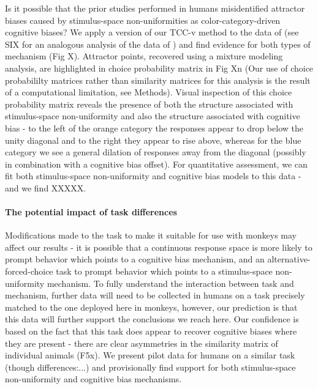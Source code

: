 \documentclass[9pt,biorxiv,lineno,onehalfspacing]{lapreprint}
\begin{document}
\begin{refsection}
Is it possible that the prior studies performed in humans misidentified attractor biases caused by stimulus-space non-uniformities as color-category-driven cognitive biases?
We apply a version of our TCC-v method to the data of \citet{bae_why_2015} (see SIX for an analogous analysis of the data of \citet{panichello_error-correcting_2019}%
) and find evidence for both types of mechanism (Fig X).
Attractor points, recovered using a mixture modeling analysis, are highlighted in choice probability matrix in Fig Xn (Our use of choice probabililty matrices rather than similarity matrices for this analysis is the result of a computational limitation, see Methods).
Visual inspection of this choice probability matrix reveals the presence of both the structure associated with stimulus-space non-uniformity and also the structure associated with cognitive bias - to the left of the orange category the responses appear to drop below the unity diagonal and to the right they appear to rise above, whereas for the blue category we see a general dilation of responses away from the diagonal (possibly in combination with a cognitive bias offset).
For quantitative assessment, we can fit both stimulus-space non-uniformity and cognitive bias models to this data - and we find XXXXX.

\paragraph{The potential impact of task differences}

Modifications made to the task to make it suitable for use with monkeys may affect our results - it is possible that a continuous response space is more likely to prompt behavior which points to a cognitive bias mechanism, and an alternative-forced-choice task to prompt behavior which points to a stimulus-space non-uniformity mechanism.
To fully understand the interaction between task and mechanism, further data will need to be collected in humans on a task precisely matched to the one deployed here in monkeys, however, our prediction is that this data will further support the conclusions we reach here.
Our confidence is based on the fact that this task does appear to recover cognitive biases where they are present - there are clear asymmetries in the similarity matrix of individual animals (F5x).
We present pilot data for humans on a similar task (though differences:...) and provisionally find support for both stimulus-space non-uniformity and cognitive bias mechanisms.


\end{refsection}
\end{document}
